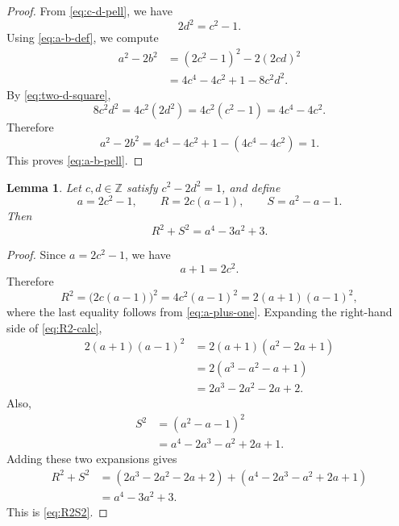 \documentclass[11pt]{article}
\numberwithin{equation}{section}
\newtheorem{lemma}[theorem]{Lemma}
\theoremstyle{remark}
\begin{document}
\begin{proof}
From \eqref{eq:c-d-pell}, we have
\begin{equation}\label{eq:two-d-square}
    2d^2=c^2-1.
\end{equation}
Using \eqref{eq:a-b-def}, we compute
\begin{align*}
    a^2-2b^2
    &=(2c^2-1)^2-2(2cd)^2\\
    &=4c^4-4c^2+1-8c^2d^2.
\end{align*}
By \eqref{eq:two-d-square},
\[
    8c^2d^2=4c^2(2d^2)=4c^2(c^2-1)=4c^4-4c^2.
\]
Therefore
\[
    a^2-2b^2
    =4c^4-4c^2+1-(4c^4-4c^2)=1.
\]
This proves \eqref{eq:a-b-pell}.
\end{proof}

\begin{lemma}\label{lem:RS}
Let \(c,d\in\mathbb Z\) satisfy \(c^2-2d^2=1\), and define
\[
    a=2c^2-1,
    \qquad
    R=2c(a-1),
    \qquad
    S=a^2-a-1.
\]
Then
\begin{equation}\label{eq:R2S2}
    R^2+S^2=a^4-3a^2+3.
\end{equation}
\end{lemma}

\begin{proof}
Since \(a=2c^2-1\), we have
\begin{equation}\label{eq:a-plus-one}
    a+1=2c^2.
\end{equation}
Therefore
\begin{equation}\label{eq:R2-calc}
    R^2=\bigl(2c(a-1)\bigr)^2=4c^2(a-1)^2=2(a+1)(a-1)^2,
\end{equation}
where the last equality follows from \eqref{eq:a-plus-one}.  Expanding the right-hand side of \eqref{eq:R2-calc},
\begin{align*}
    2(a+1)(a-1)^2
    &=2(a+1)(a^2-2a+1)\\
    &=2(a^3-a^2-a+1)\\
    &=2a^3-2a^2-2a+2.
\end{align*}
Also,
\begin{align*}
    S^2
    &=(a^2-a-1)^2\\
    &=a^4-2a^3-a^2+2a+1.
\end{align*}
Adding these two expansions gives
\begin{align*}
    R^2+S^2
    &=(2a^3-2a^2-2a+2)
      +(a^4-2a^3-a^2+2a+1)\\
    &=a^4-3a^2+3.
\end{align*}
This is \eqref{eq:R2S2}.
\end{proof}
\end{document}
